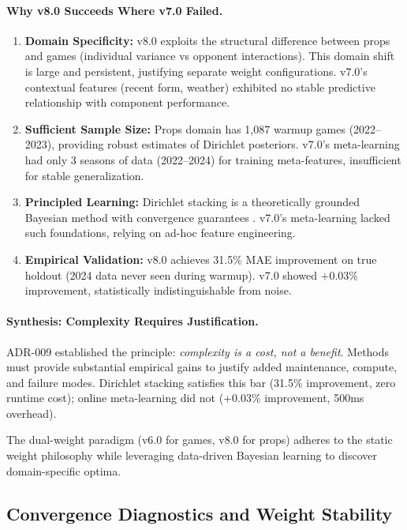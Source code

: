 \paragraph{Why v8.0 Succeeds Where v7.0 Failed.}
\begin{enumerate}
\item \textbf{Domain Specificity:} v8.0 exploits the structural difference between props and games (individual variance vs opponent interactions). This domain shift is large and persistent, justifying separate weight configurations. v7.0's contextual features (recent form, weather) exhibited no stable predictive relationship with component performance.

\item \textbf{Sufficient Sample Size:} Props domain has 1,087 warmup games (2022--2023), providing robust estimates of Dirichlet posteriors. v7.0's meta-learning had only 3 seasons of data (2022--2024) for training meta-features, insufficient for stable generalization.

\item \textbf{Principled Learning:} Dirichlet stacking is a theoretically grounded Bayesian method with convergence guarantees \citep{yao2018}. v7.0's meta-learning lacked such foundations, relying on ad-hoc feature engineering.

\item \textbf{Empirical Validation:} v8.0 achieves 31.5\% MAE improvement on true holdout (2024 data never seen during warmup). v7.0 showed +0.03\% improvement, statistically indistinguishable from noise.
\end{enumerate}

\paragraph{Synthesis: Complexity Requires Justification.}
ADR-009 established the principle: \emph{complexity is a cost, not a benefit}. Methods must provide substantial empirical gains to justify added maintenance, compute, and failure modes. Dirichlet stacking satisfies this bar (31.5\% improvement, zero runtime cost); online meta-learning did not (+0.03\% improvement, 500ms overhead).

The dual-weight paradigm (v6.0 for games, v8.0 for props) adheres to the static weight philosophy while leveraging data-driven Bayesian learning to discover domain-specific optima.

\subsection{Convergence Diagnostics and Weight Stability}
\label{subsec:convergence-diagnostics}

